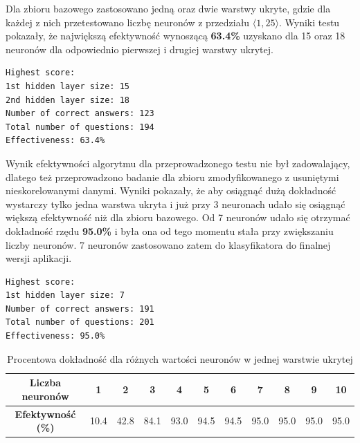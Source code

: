 Dla zbioru bazowego zastosowano jedną oraz dwie warstwy ukryte, gdzie dla każdej z nich przetestowano liczbę neuronów z przedziału $\langle1, 25\rangle$. Wyniki testu pokazały, że największą efektywność wynoszącą \textbf{63.4\%} uzyskano dla 15 oraz 18 neuronów dla odpowiednio pierwszej i drugiej warstwy ukrytej.

\begin{lstlisting}[caption=Wynik badań dla zbioru bazowego]
Highest score:
1st hidden layer size: 15
2nd hidden layer size: 18
Number of correct answers: 123
Total number of questions: 194
Effectiveness: 63.4%
\end{lstlisting}

\newpage

Wynik efektywności algorytmu dla przeprowadzonego testu nie był zadowalający, dlatego też przeprowadzono badanie dla zbioru zmodyfikowanego z usuniętymi nieskorelowanymi danymi. Wyniki pokazały, że aby osiągnąć dużą dokładność wystarczy tylko jedna warstwa ukryta i już przy 3 neuronach udało się osiągnąć większą efektywność niż dla zbioru bazowego. Od 7 neuronów udało się otrzymać dokładność rzędu \textbf{95.0\%} i była ona od tego momentu stała przy zwiększaniu liczby neuronów. 7 neuronów zastosowano zatem do klasyfikatora do finalnej wersji aplikacji.

\begin{lstlisting}[caption=Wynik badań dla zbioru zmodyfikowanego]
Highest score:
1st hidden layer size: 7
Number of correct answers: 191
Total number of questions: 201
Effectiveness: 95.0%
\end{lstlisting}

\begin{table}[ht!]
\centering
\caption{Procentowa dokładność dla różnych wartości neuronów w jednej warstwie ukrytej}
\label{score}
\begin{tabular}{@{}|c|c|c|c|c|c|c|c|c|c|c|@{}}
\toprule
\textbf{Liczba neuronów}  & 1    & 2    & 3    & 4    & 5    & 6    & 7    & 8    & 9    & 10   \\ \midrule
\textbf{Efektywność (\%)} & 10.4 & 42.8 & 84.1 & 93.0 & 94.5 & 94.5 & 95.0 & 95.0 & 95.0 & 95.0 \\ \bottomrule
\end{tabular}
\end{table}

